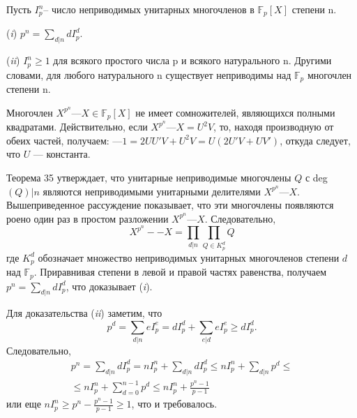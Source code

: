 \documentclass{mai_book}
\begin{document}
\begin{sled}
\hspace*{0.5cm}Пусть $I^n_p$-- число неприводимых унитарных многочленов в $\mathbb{F}_p[X]$
степени n.

\newpage

\hspace*{0.5cm}(\textit{i}) $p^n = \sum_{d|n}dI^d_p$.

\hspace*{0.5cm}(\textit{ii}) $I^n_p \geq 1$ для всякого простого числа p и всякого натурального n.
Другими словами, для любого натурального n существует неприводимы над $\mathbb{F}_p$ многочлен степени n.\newline
\end{sled}

\begin{myproof}
Многочлен $X^{p^n} — X \in \mathbb{F}_p[X]$ не имеет сомножителей, являющихся 
полными квадратами. Действительно, если $X^{p^n} — X = U^2V$, то, 
находя производную от обеих частей, получаем: $— 1 = 2UU'V + 
U^2V = U(2U'V + UV')$, откуда следует, что $U$ — константа.
 
\noindent Теорема 35 утверждает, что унитарные неприводимые многочлены 
$Q$ с deg$(Q) | n$ являются неприводимыми унитарными делителями 
$X^{p^n} — X$. Вышеприведенное рассуждение показывает, что эти  
многочлены появляются роено один раз в простом разложении $X^{p^n} — X$. 
Следовательно,
\begin{equation*}
X^{p^n} -- X =  \prod_{d|n} \prod_{Q\in K^d_p}Q
\end{equation*}
где $K^d_p$ обозначает множество неприводимых унитарных  
многочленов степени $d$ над $\mathbb{F}_p$. Приравнивая степени в левой и правой частях 
равенства, получаем $p^n = \sum_{d|n} dI^d_p$, что доказывает (\textit{i}). 

\noindent Для доказательства (\textit{ii}) заметим, что
\begin{equation*}
p^d = \sum_{d|n}eI^e_p = dI^d_p + \sum_{e|d}eI^e_p \geq dI^d_p.
\end{equation*}
Следовательно,
\begin{multline*}
p^n = \sum_{d|n}dI^d_p = nI^n_p + \sum_{d|n}dI^d_p \leq nI^n_p + \sum_{d|n}p^d \leq\\
\leq nI^n_p + \sum^{n-1}_{d = 0}p^d \leq nI^n_p + \frac{p^n - 1}{p - 1}
\end{multline*}
или еще $nI^n_p \geq p^n - \frac{p^n - 1}{p - 1} \geq 1$, что и требовалось.
\end{myproof}
\newpage
\end{document}
